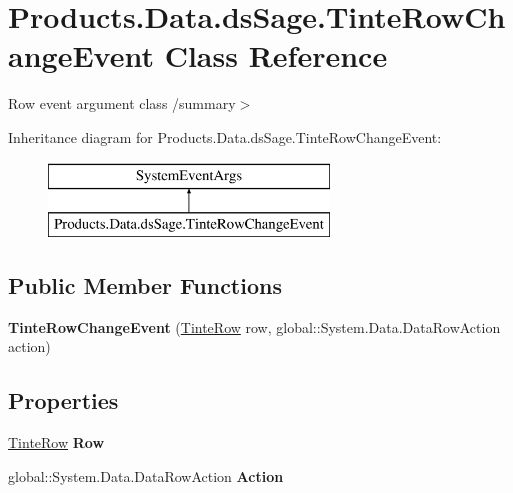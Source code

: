 \hypertarget{class_products_1_1_data_1_1ds_sage_1_1_tinte_row_change_event}{}\section{Products.\+Data.\+ds\+Sage.\+Tinte\+Row\+Change\+Event Class Reference}
\label{class_products_1_1_data_1_1ds_sage_1_1_tinte_row_change_event}


Row event argument class /summary$>$  


Inheritance diagram for Products.\+Data.\+ds\+Sage.\+Tinte\+Row\+Change\+Event\+:\begin{figure}[H]
\begin{center}
\leavevmode
\includegraphics[height=2.000000cm]{class_products_1_1_data_1_1ds_sage_1_1_tinte_row_change_event}
\end{center}
\end{figure}
\subsection*{Public Member Functions}
\begin{DoxyCompactItemize}
\item 
{\bfseries Tinte\+Row\+Change\+Event} (\hyperlink{class_products_1_1_data_1_1ds_sage_1_1_tinte_row}{Tinte\+Row} row, global\+::\+System.\+Data.\+Data\+Row\+Action action)\hypertarget{class_products_1_1_data_1_1ds_sage_1_1_tinte_row_change_event_ad794e270ba1243295c38647087508f44}{}\label{class_products_1_1_data_1_1ds_sage_1_1_tinte_row_change_event_ad794e270ba1243295c38647087508f44}

\end{DoxyCompactItemize}
\subsection*{Properties}
\begin{DoxyCompactItemize}
\item 
\hyperlink{class_products_1_1_data_1_1ds_sage_1_1_tinte_row}{Tinte\+Row} {\bfseries Row}\hypertarget{class_products_1_1_data_1_1ds_sage_1_1_tinte_row_change_event_ab128034f7aaa2638790a52a2d113a990}{}\label{class_products_1_1_data_1_1ds_sage_1_1_tinte_row_change_event_ab128034f7aaa2638790a52a2d113a990}

\item 
global\+::\+System.\+Data.\+Data\+Row\+Action {\bfseries Action}\hypertarget{class_products_1_1_data_1_1ds_sage_1_1_tinte_row_change_event_a8e27f10dd9fddbbdc76ea42e5a8cac92}{}\label{class_products_1_1_data_1_1ds_sage_1_1_tinte_row_change_event_a8e27f10dd9fddbbdc76ea42e5a8cac92}

\end{DoxyCompactItemize}


